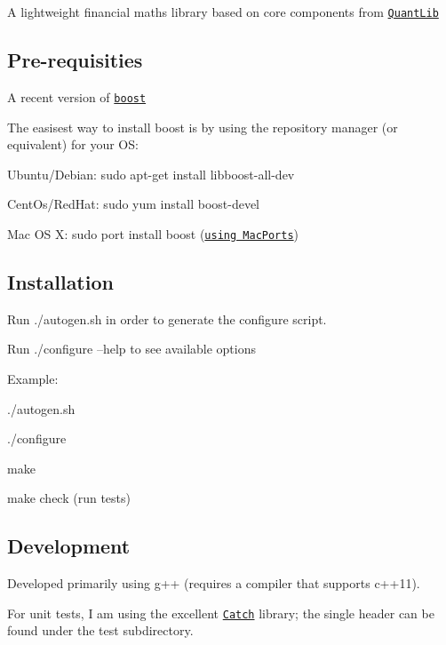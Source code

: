 A lightweight financial maths library based on core components from \href{https://github.com/lballabio/QuantLib}{\tt Quant\+Lib}

\subsection*{Pre-\/requisities }


\begin{DoxyItemize}
\item A recent version of \href{http://www.boost.org}{\tt boost}
\item The easisest way to install boost is by using the repository manager (or equivalent) for your O\+S\+:
\begin{DoxyItemize}
\item Ubuntu/\+Debian\+: sudo apt-\/get install libboost-\/all-\/dev
\item Cent\+Os/\+Red\+Hat\+: sudo yum install boost-\/devel
\item Mac O\+S X\+: sudo port install boost (\href{https://www.macports.org/}{\tt using Mac\+Ports})
\end{DoxyItemize}
\end{DoxyItemize}

\subsection*{Installation }


\begin{DoxyItemize}
\item Run ./autogen.sh in order to generate the configure script.
\item Run ./configure --help to see available options
\item Example\+:
\begin{DoxyItemize}
\item ./autogen.sh
\item ./configure
\item make
\item make check (run tests)
\end{DoxyItemize}
\end{DoxyItemize}

\subsection*{Development }


\begin{DoxyItemize}
\item Developed primarily using g++ (requires a compiler that supports c++11).
\item For unit tests, I am using the excellent \href{https://github.com/philsquared/Catch}{\tt Catch} library; the single header can be found under the test subdirectory.
\end{DoxyItemize}

